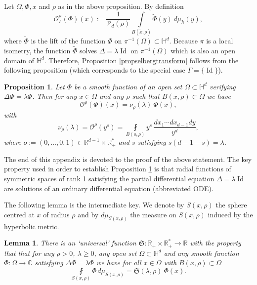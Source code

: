 \documentclass[10pt]{amsart}
\let\mathcal\mathscr
\theoremstyle{plain}
\newtheorem{proposition}[equation]{Proposition}
\newtheorem{lemma}[equation]{Lemma}
\theoremstyle{definition}
\newcommand{\HH}{\mathbb{H}}
\newcommand{\RR}{\mathbb{R}}
\newcommand{\CC}{\mathbb{C}}
\newcommand{\inte}[1]{\underset{#1}{\int}}
\newcommand{\finte}[3]{\underset{#1}{\fint} {#2} \, {#3}}
\DeclareMathOperator{\Id}{Id}
\begin{document}
Let $\Omega, \Phi, x$ and $\rho$ as in the above proposition. By definition
\[
\mathcal{O}^{\rho}_{\Gamma}(\Phi)(x) := \frac{1}{\mathcal{V}_d(\rho)} \inte{B(\tilde{x},\rho)} \tilde{\Phi}(y) \,d \mu_h(y),
\]
where $\tilde{\Phi}$ is the lift of the function $\Phi$ on $\pi^{-1}(\Omega) \subset \HH^d$. Because $\pi$ is a local isometry, the function $\tilde{\Phi}$ solves $\Delta = \lambda \Id$ on $\pi^{-1}(\Omega)$ which is also an open domain of $\HH^d$. Therefore, Proposition \ref{propselbergtransform} follows from the following proposition (which corresponds to the special case $\Gamma = \{\Id\}$).

\begin{proposition}
\label{propselbergprepretrace}
Let $\Phi$ be a smooth function of an open set $\Omega \subset \HH^d$ verifying $\Delta \Phi = \lambda \Phi$. Then for any $x \in \Omega$ and any $\rho$ such that $B(x,\rho) \subset \Omega$ we have
\begin{equation*}
\mathcal{O}^{\rho}(\Phi)(x) = \nu_{\rho}(\lambda) \ \Phi(x),
\end{equation*}
with
\begin{equation*}
\nu_{\rho}(\lambda) = \mathcal{O}^{\rho}(y^s) = \finte{B(o,\rho)} { y^s}{ \frac{dx_1\cdots dx_{d-1} dy}{y^d}},
\end{equation*}
where $o := (0,\dots, 0, 1) \in \RR^{d-1} \times \RR_+^*$ and $s$ satisfying $s(d-1-s) = \lambda$.
\end{proposition}

The end of this appendix is devoted to the proof of the above statement. The key property used in order to establish Proposition \ref{propselbergprepretrace} is that radial functions of symmetric spaces of rank 1 satisfying the partial differential equation $\Delta = \lambda \Id$ are solutions of an ordinary differential equation (abbreviated ODE).

The following lemma is the intermediate key. We denote by $S(x,\rho)$ the sphere centred at $x$ of radius $\rho$ and by $d \mu_{S(x,\rho)}$ the measure on $S(x,\rho)$ induced by the hyperbolic metric.

\begin{lemma}
\label{lemmaappendix2}
There is an `universal' function $\mathfrak{S} : \RR_+ \times \RR_+^* \to \RR$ with the property that that for any $\rho >0$, $\lambda \ge 0$, any open set $\Omega \subset \HH^d$ and any smooth function $\Phi : \Omega \to \CC$ satisfying $\Delta \Phi = \lambda \Phi$ we have for all $x \in \Omega$ with $B(x,\rho) \subset \Omega$
\[
\finte{S(x, \rho)}{\Phi}{ d \mu_{S(x,\rho)}} = \mathfrak{S}(\lambda,\rho) \ \Phi(x).
\]
\end{lemma}
\end{document}
